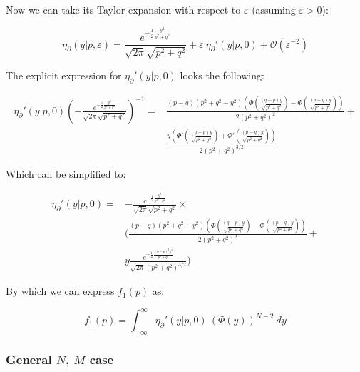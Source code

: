 \documentclass{article}
\theoremstyle{definition}
\begin{document}
Now we can take its Taylor-expansion with respect to $\varepsilon$ (assuming $\varepsilon>0$):

\begin{equation}
    \eta_\partial(y|p,\varepsilon)
    =
    \frac{e^{-\frac{1}{2} \frac{y^2}{p^2 + q^2}}}{\sqrt{2 \pi} \sqrt{p^2 + q^2}} +
    \varepsilon \ \eta_\partial'(y|p,0) + \mathcal{O}(\varepsilon^{-2})
\end{equation}

The explicit expression for $\eta_\partial'(y|p,0)$ looks the following:

\begin{equation}
\begin{split}
\eta_\partial'(y|p,0)
\left( -\frac{e^{-\frac{1}{2} \frac{y^2}{p^2 + q^2}}}{\sqrt{2 \pi} \sqrt{p^2 + q^2}} \right)^{-1}
= &
\frac{
    (p - q) (p^2 + q^2 - y^2) \left( \Phi\left( \frac{(q - p) y}{\sqrt{p^2 + q^2}} \right) -\Phi\left( \frac{(p - q) y}{\sqrt{p^2 + q^2}} \right) \right) 
}{
    2 (p^2 + q^2)^2
} + \\
&\frac{
    y \left( \Phi'\left( \frac{(q-p) y}{\sqrt{p^2 + q^2}} \right) + \Phi'\left( \frac{(p - q) y}{\sqrt{p^2 + q^2}} \right)  
    \right)
}{
    2 (p^2 + q^2)^{3/2}
    }
\end{split}
\end{equation}

Which can be simplified to:

\begin{equation}
\begin{split}
\eta_\partial'(y|p,0)
= &
 - \frac{e^{-\frac{1}{2} \frac{y^2}{p^2 + q^2}}}{\sqrt{2 \pi} \sqrt{p^2 + q^2}} \times \\
& \Bigg(
\frac{
    (p - q) (p^2 + q^2 - y^2) \left( \Phi\left( \frac{(q - p) y}{\sqrt{p^2 + q^2}} \right) -\Phi\left( \frac{(p - q) y}{\sqrt{p^2 + q^2}} \right) \right) 
}{
    2 (p^2 + q^2)^2
} + \\
&y \frac{
     e^{-\frac{1}{2} \frac{(q-p)^2 y^2}{p^2 + q^2}} 
}{
    \sqrt{2 \pi} (p^2 + q^2)^{3/2}
    }
    \Bigg)
\end{split}
\end{equation}

By which we can express $f_1(p)$ as:

\begin{equation}
    f_1(p)
    =
    \int_{-\infty}^\infty \eta_\partial'(y|p,0) \  (\Phi(y))^{N-2} \ d y
\end{equation}

\subsubsection{General $N$, $M$ case}
\end{document}
